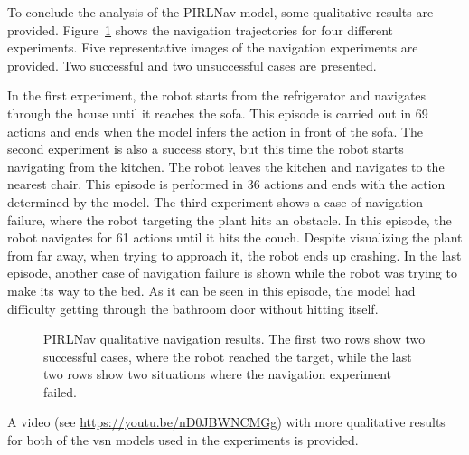 To conclude the analysis of the PIRLNav model, some qualitative results are provided.
Figure~\ref{fig:pirlnav_qualitative} shows the navigation trajectories for four different experiments.
Five representative images of the navigation experiments are provided.
Two successful and two unsuccessful cases are presented.

In the first experiment, the robot starts from the refrigerator and navigates through the house until it reaches the sofa.
This episode is carried out in 69 actions and ends when the model infers the action \stopac in front of the sofa.
The second experiment is also a success story, but this time the robot starts navigating from the kitchen.
The robot leaves the kitchen and navigates to the nearest chair.
This episode is performed in 36 actions and ends with the \stopac action determined by the model.
The third experiment shows a case of navigation failure, where the robot targeting the plant hits an obstacle.
In this episode, the robot navigates for 61 actions until it hits the couch.
Despite visualizing the plant from far away, when trying to approach it, the robot ends up crashing.
In the last episode, another case of navigation failure is shown while the robot was trying to make its way to the bed.
As it can be seen in this episode, the model had difficulty getting through the bathroom door without hitting itself.

\begin{figure}
    \centering
        \caption{PIRLNav qualitative navigation results. The first two rows show two successful cases, where the robot reached the target, while the last two rows show two situations where the navigation experiment failed.}
        \label{fig:pirlnav_qualitative}
\end{figure}

A video (see \url{https://youtu.be/nD0JBWNCMGg}) with more qualitative results for both of the \acrshort{vsn} models used in the experiments is provided.

